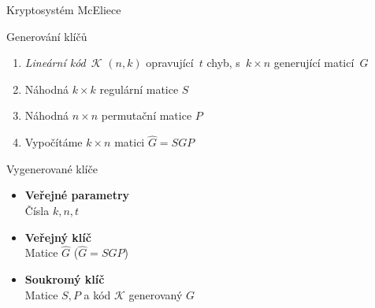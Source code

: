 \documentclass{beamer}
\begin{document}
\begin{frame}{Kryptosystém McEliece}

    \begin{block}{Generování klíčů}
        \begin{enumerate}

            \item \emph{Lineární kód}~$\mathcal{K}$ $(n,k)$
                opravující~$t$ chyb, s~$k \times n$ \alert{generující
                maticí~$G$}
            \item Náhodná $k \times k$ \alert{regulární matice $S$}
            \item Náhodná $n \times n$ \alert{permutační matice $P$}
            \item Vypočítáme $k \times n$ matici $\hat{G} = S G P$

        \end{enumerate}
    \end{block}

        \pause
    \begin{block}{Vygenerované klíče}
        \begin{itemize}
            \item[] \textbf{Veřejné parametry} \hfil \\
                \hspace{0.5cm} Čísla $k, n, t$
            \item[] \textbf{Veřejný klíč} \hfil \\
                \hspace{0.5cm} Matice $\hat{G}$ ($\hat{G} = S G P$)
            \item[] \textbf{Soukromý klíč} \hfil \\
                \hspace{0.5cm} Matice $S, P$ a kód $\mathcal{K}$ generovaný $G$
        \end{itemize}
    \end{block}

\end{frame}
\end{document}
